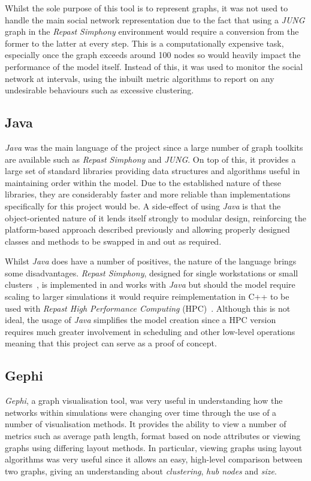 \documentclass[]{report}
\begin{document}
Whilst the sole purpose of this tool is to represent graphs, it was not used to handle the main social network representation due to the fact that using a \emph{JUNG} graph in the \emph{Repast Simphony} environment would require a conversion from the former to the latter at every step. This is a computationally expensive task, especially once the graph exceeds around 100 nodes so would heavily impact the performance of the model itself. Instead of this, it was used to monitor the social network at intervals, using the inbuilt metric algorithms to report on any undesirable behaviours such as excessive clustering.

\subsection{Java}
\emph{Java} was the main language of the project since a large number of graph toolkits are available such as \emph{Repast Simphony} and \emph{JUNG}. On top of this, it provides a large set of standard libraries providing data structures and algorithms useful in maintaining order within the model. Due to the established nature of these libraries, they are considerably faster and more reliable than implementations specifically for this project would be. A side-effect of using \emph{Java} is that the object-oriented nature of it lends itself strongly to modular design, reinforcing the platform-based approach described previously and allowing properly designed classes and methods to be swapped in and out as required.

Whilst \emph{Java} does have a number of positives, the nature of the language brings some disadvantages. \emph{Repast Simphony}, designed for single workstations or small clusters~\cite{repast-simp}, is implemented in and works with \emph{Java} but should the model require scaling to larger simulations it would require reimplementation in C++ to be used with \emph{Repast High Performance Computing} (HPC)~\cite{repast-HPC}. Although this is not ideal, the usage of \emph{Java} simplifies the model creation since a HPC version requires much greater involvement in scheduling and other low-level operations meaning that this project can serve as a proof of concept.

\subsection{Gephi}
\emph{Gephi}, a graph visualisation tool, was very useful in understanding how the networks within simulations were changing over time through the use of a number of visualisation methods. It provides the ability to view a number of metrics such as average path length, format based on node attributes or viewing graphs using differing layout methods. In particular, viewing graphs using layout algorithms was very useful since it allows an easy, high-level comparison between two graphs, giving an understanding about \emph{clustering}, \emph{hub nodes} and \emph{size}.
\end{document}
